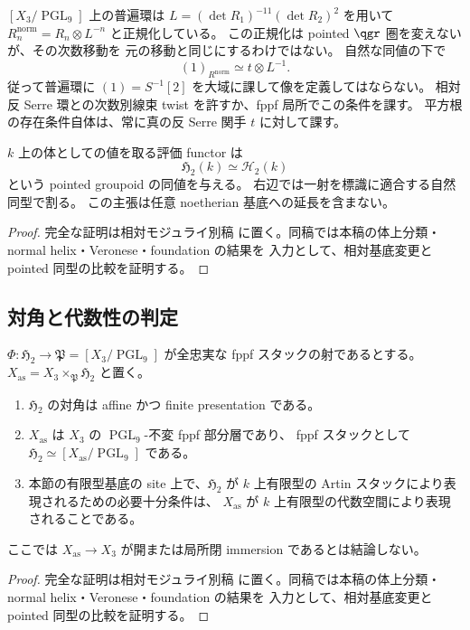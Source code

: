 \begin{remark}[普遍環の次数別線束と認識条件]
\label{rem:relative-h2-line-twist}
$[X_3/\operatorname{PGL}_9]$ 上の普遍環は
$L=(\det R_1)^{-11}(\det R_2)^2$ を用いて
$R_n^{\mathrm{norm}}=R_n\otimes L^{-n}$ と正規化している。
この正規化は pointed $\qgr$ 圏を変えないが、その次数移動を
元の移動と同じにするわけではない。
自然な同値の下で
\[
 (1)_{R^{\mathrm{norm}}}\simeq t\otimes L^{-1}.
\]
従って普遍環に $(1)=S^{-1}[2]$ を大域に課して像を定義してはならない。
相対反 Serre 環との次数別線束 twist を許すか、fppf 局所でこの条件を課す。
平方根の存在条件自体は、常に真の反 Serre 関手 $t$ に対して課す。
\end{remark}

\begin{proposition}[体上の対象の回復]
\label{prop:relative-h2-field-recovery}
$k$ 上の体としての値を取る評価 functor は
\[
 \mathfrak H_2(k)\simeq\mathcal H_2(k)
\]
という pointed groupoid の同値を与える。
右辺では一射を標識に適合する自然同型で割る。
この主張は任意 noetherian 基底への延長を含まない。
\end{proposition}
\begin{proof}
完全な証明は相対モジュライ別稿
\cite[相対反 Serre 再構成と三次表示の認識]{QuadricModuli2026}
に置く。同稿では本稿の体上分類・normal helix・Veronese・foundation の結果を
入力として、相対基底変更と pointed 同型の比較を証明する。
\end{proof}


\subsection{対角と代数性の判定}

\begin{proposition}[相対認識から対角と代数性判定への還元]
\label{prop:relative-h2-algebraicity-reduction}
$\Phi:\mathfrak H_2\to\mathfrak P=[X_3/\operatorname{PGL}_9]$
が全忠実な fppf スタックの射であるとする。
$X_{\mathrm{as}}=X_3\times_{\mathfrak P}\mathfrak H_2$ と置く。
\begin{enumerate}
\item $\mathfrak H_2$ の対角は affine かつ finite presentation である。
\item $X_{\mathrm{as}}$ は $X_3$ の $\operatorname{PGL}_9$-不変 fppf 部分層であり、
  fppf スタックとして $\mathfrak H_2\simeq
  [X_{\mathrm{as}}/\operatorname{PGL}_9]$ である。
\item 本節の有限型基底の site 上で、$\mathfrak H_2$ が
  $k$ 上有限型の Artin スタックにより表現されるための必要十分条件は、
  $X_{\mathrm{as}}$ が $k$ 上有限型の代数空間により表現されることである。
\end{enumerate}
ここでは $X_{\mathrm{as}}\to X_3$ が開または局所閉 immersion であるとは結論しない。
\end{proposition}
\begin{proof}
完全な証明は相対モジュライ別稿
\cite[相対反 Serre 再構成と三次表示の認識]{QuadricModuli2026}
に置く。同稿では本稿の体上分類・normal helix・Veronese・foundation の結果を
入力として、相対基底変更と pointed 同型の比較を証明する。
\end{proof}


